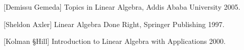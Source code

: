\documentclass[12pt]{article}
\theoremstyle{definition}
\begin{document}
 \begin{thebibliography}{9}

[Demissu Gemeda]
Topics in Linear Algebra,
Addis Ababa University 2005.

[Sheldon Axler]
Linear Algebra Done Right,
Springer Publishing 1997.

[Kolman \S  Hill]
Introduction to Linear Algebra with Applications 2000.

\end{thebibliography}
\end{document}

